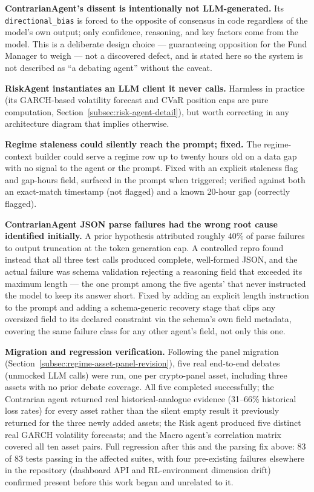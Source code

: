 \textbf{ContrarianAgent's dissent is intentionally not LLM-generated.} Its \texttt{directional\_bias} is forced to the opposite of consensus in code regardless of the model's own output; only confidence, reasoning, and key factors come from the model. This is a deliberate design choice --- guaranteeing opposition for the Fund Manager to weigh --- not a discovered defect, and is stated here so the system is not described as ``a debating agent'' without the caveat.

\textbf{RiskAgent instantiates an LLM client it never calls.} Harmless in practice (its GARCH-based volatility forecast and CVaR position caps are pure computation, Section~\ref{subsec:risk-agent-detail}), but worth correcting in any architecture diagram that implies otherwise.

\textbf{Regime staleness could silently reach the prompt; fixed.} The regime-context builder could serve a regime row up to twenty hours old on a data gap with no signal to the agent or the prompt. Fixed with an explicit staleness flag and gap-hours field, surfaced in the prompt when triggered; verified against both an exact-match timestamp (not flagged) and a known 20-hour gap (correctly flagged).

\textbf{ContrarianAgent JSON parse failures had the wrong root cause identified initially.} A prior hypothesis attributed roughly 40\% of parse failures to output truncation at the token generation cap. A controlled repro found instead that all three test calls produced complete, well-formed JSON, and the actual failure was schema validation rejecting a reasoning field that exceeded its maximum length --- the one prompt among the five agents' that never instructed the model to keep its answer short. Fixed by adding an explicit length instruction to the prompt and adding a schema-generic recovery stage that clips any oversized field to its declared constraint via the schema's own field metadata, covering the same failure class for any other agent's field, not only this one.

\textbf{Migration and regression verification.} Following the panel migration (Section~\ref{subsec:regime-asset-panel-revision}), five real end-to-end debates (unmocked LLM calls) were run, one per crypto-panel asset, including three assets with no prior debate coverage. All five completed successfully; the Contrarian agent returned real historical-analogue evidence (31--66\% historical loss rates) for every asset rather than the silent empty result it previously returned for the three newly added assets; the Risk agent produced five distinct real GARCH volatility forecasts; and the Macro agent's correlation matrix covered all ten asset pairs. Full regression after this and the parsing fix above: 83 of 83 tests passing in the affected suites, with four pre-existing failures elsewhere in the repository (dashboard API and RL-environment dimension drift) confirmed present before this work began and unrelated to it.

